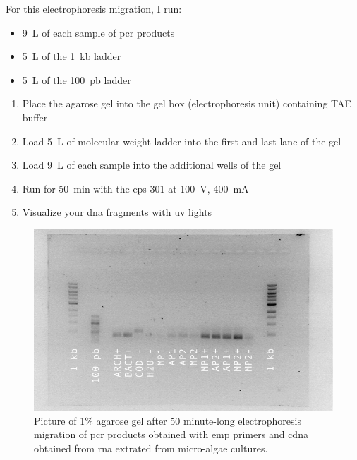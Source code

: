 For this electrophoresis migration, I run:
\begin{itemize}
\item 9~\textmu L of each sample of \gls{pcr} products
\item 5~\textmu L of the 1~kb ladder
\item 5~\textmu L of the 100~pb ladder
\end{itemize}

\begin{enumerate}
\item Place the agarose gel into the gel box (electrophoresis unit) containing TAE buffer
\item Load 5~\textmu L of molecular weight ladder into the first and last lane of the gel
\item Load 9~\textmu L of each sample into the additional wells of the gel
\item Run for 50~min with the \gls{eps} 301 at 100~V, 400~mA
\item Visualize your \gls{dna} fragments with \gls{uv} lights
\end{enumerate}

\begin{figure}[H] %
    \centering
    \caption{Picture of 1\% agarose gel after 50 minute-long electrophoresis migration of \gls{pcr} products obtained with \gls{emp} primers and \gls{cdna} obtained from \gls{rna} extrated from micro-algae cultures.}
    \label{fig:20180217_EMP_OneTaq_MasterPure_vs_AllPrep}
    \includegraphics[width=\textwidth]{graphics/pic/20180217_EMP_OneTaq_MasterPure_vs_AllPrep.png}
\end{figure}
